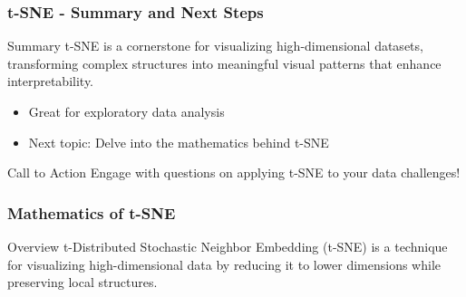 \documentclass[aspectratio=169]{beamer}
\begin{document}
\begin{frame}[fragile]
    \frametitle{t-SNE - Summary and Next Steps}
    \begin{block}{Summary}
        t-SNE is a cornerstone for visualizing high-dimensional datasets, transforming complex structures into meaningful visual patterns that enhance interpretability.
    \end{block}
    \begin{itemize}
        \item Great for exploratory data analysis
        \item Next topic: Delve into the mathematics behind t-SNE
    \end{itemize}
    \begin{block}{Call to Action}
        Engage with questions on applying t-SNE to your data challenges!
    \end{block}
\end{frame}

\begin{frame}[fragile]
    \frametitle{Mathematics of t-SNE}
    \begin{block}{Overview}
        t-Distributed Stochastic Neighbor Embedding (t-SNE) is a technique for visualizing high-dimensional data by reducing it to lower dimensions while preserving local structures.
    \end{block}
\end{frame}
\end{document}
